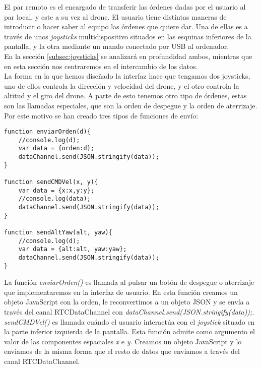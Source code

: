 El par remoto es el encargado de transferir las órdenes dadas por el usuario al par local, y este a su vez al drone. El usuario tiene distintas maneras de introducir o hacer saber al equipo las órdenes que quiere dar. Una de ellas es a través de unos \emph{joysticks} multidispositivo situados en las esquinas inferiores de la pantalla, y la otra mediante un mando conectado por USB al ordenador.\\

En la sección \ref{subsec:joysticks} se analizará en profundidad ambos, mientras que en esta sección nos centraremos en el intercambio de los datos.\\

La forma en la que hemos diseñado la interfaz hace que tengamos dos joysticks, uno de ellos controla la dirección y velocidad del drone, y el otro controla la altitud y el giro del drone. A parte de esto tenemos otro tipo de órdenes, estas son las llamadas especiales, que son la orden de despegue y la orden de aterrizaje. Por este motivo se han creado tres tipos de funciones de envío:\\

\begin{lstlisting}[caption=Funciones de envío de órdenes en el par remoto.]
function enviarOrden(d){
    //console.log(d);
    var data = {orden:d};
    dataChannel.send(JSON.stringify(data));
}

function sendCMDVel(x, y){
    var data = {x:x,y:y};
    //console.log(data);
    dataChannel.send(JSON.stringify(data));
}

function sendAltYaw(alt, yaw){
    //console.log(d);
    var data = {alt:alt, yaw:yaw};
    dataChannel.send(JSON.stringify(data));
}
\end{lstlisting}

La función \emph{enviarOrden()} es llamada al pulsar un botón de despegue o aterrizaje que implementaremos en la interfaz de usuario. En esta función creamos un objeto JavaScript con la orden, le reconvertimos a un objeto JSON y se envía a través del canal RTCDataChannel con \emph{dataChannel.send(JSON.stringify(data));}.\\


\emph{sendCMDVel()} es llamada cuándo el usuario interactúa con el \emph{joystick} situado en la parte inferior izquierda de la pantalla. Esta función admite como argumento el valor de las componentes espaciales \emph{x} e \emph{y}. Creamos un objeto JavaScript y lo enviamos de la misma forma que el resto de datos que enviamos a través del canal RTCDataChannel.\\

